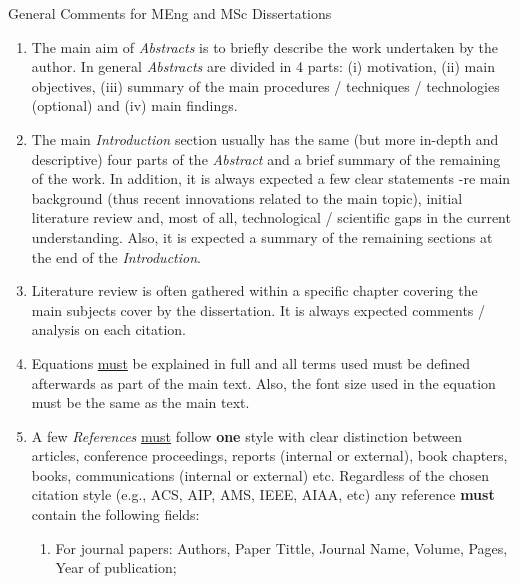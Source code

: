 \documentclass[14pt,twoside]{report}
\begin{document}
\clearpage

\vfill 



\bigskip

\begin{center}
{\Large General Comments for MEng and MSc Dissertations }
\end{center}

\medskip

\begin{enumerate}
\item The main aim of {\it Abstracts} is to briefly describe the work undertaken by the author. In general {\it Abstracts} are divided in 4 parts: (i) motivation, (ii) main objectives, (iii) summary of the main procedures / techniques / technologies (optional) and (iv) main findings. 
%
\item The main {\it Introduction} section usually has the same (but more in-depth and descriptive) four parts of the {\it Abstract} and a brief summary of the remaining of the work. In addition, it is always expected a few clear statements -re main background (thus recent innovations related to the main topic), initial literature review and, most of all, technological / scientific gaps in the current understanding. Also, it is expected a summary of the remaining sections at the end of the {\it Introduction}. 
%
\item Literature review is often gathered within a specific chapter covering the main subjects cover by the dissertation. It is always expected comments / analysis on each citation.
%
\item Equations \underline{must} be explained in full and all terms used must be defined afterwards as part of the main text. Also, the font size used in the equation must be the same as the main text.
%
\item A few {\it References} \underline{must} follow {\bf one} style with clear distinction between articles, conference proceedings, reports (internal or external), book chapters, books, communications (internal or external) etc.  Regardless of the chosen citation style (e.g., ACS, AIP, AMS, IEEE, AIAA, etc) any reference {\bf must} contain the following fields: 
\begin{enumerate}
\item For journal papers: Authors, Paper Tittle, Journal Name, Volume, Pages, Year of publication;

\end{enumerate}
\end{enumerate}
\end{document}
